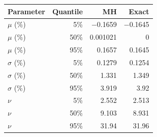 \begin{tabular}{@{}lrrr@{}}
\toprule
Parameter & Quantile & MH & Exact \\
\midrule
$\mu$ (\%) & 5\% & $-$0.1659 & $-$0.1645 \\
$\mu$ (\%) & 50\% & 0.001021 & 0 \\
$\mu$ (\%) & 95\% & 0.1657 & 0.1645 \\
$\sigma$ (\%) & 5\% & 0.1279 & 0.1254 \\
$\sigma$ (\%) & 50\% & 1.331 & 1.349 \\
$\sigma$ (\%) & 95\% & 3.919 & 3.92 \\
$\nu$ & 5\% & 2.552 & 2.513 \\
$\nu$ & 50\% & 9.103 & 8.931 \\
$\nu$ & 95\% & 31.94 & 31.96 \\
\bottomrule
\end{tabular}
